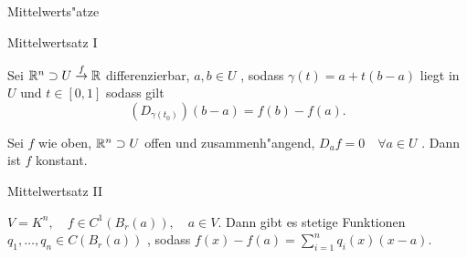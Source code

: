 \documentclass[class=article, crop=false]{standalone}
\begin{document}
\begin{zettel}{Mittelwerts"atze}
\begin{flashcard}[nxg5qj0i]{Mittelwertsatz I}
	\begin{theorem}[Mittelwertsatz I]
		Sei $\mathbb{R}^n \supset  U \stackrel{f}{\to} \mathbb{R} $ differenzierbar, $a, b \in  U$ , sodass $\gamma(t) = a + t (b-a)$ liegt in $U$ und $t \in [0,1]$ sodass gilt
		\[
			\left(D_{\gamma(t_0)}\right) (b - a ) = f(b) - f(a)
		.\]
	\end{theorem}
\end{flashcard}

\begin{corollary}
	Sei $f$ wie oben, $\mathbb{R}^n \supset  U$ offen und zusammenh"angend, $D_a f = 0 \quad \forall a \in  U$ . Dann ist $f$ konstant.
\end{corollary}

\begin{flashcard}[ox7gzhr6]{Mittelwertsatz II}
	\begin{theorem}[Mittelwertsatz II]
		$V = K^n, \quad f \in  C^1 ( B_r(a)), \quad a \in  V$. Dann gibt es stetige Funktionen $ q_1,\dots,q_n \in  C ( B_r(a))$ , sodass $f(x) - f(a) = \sum_{i = 1}^{n} q_i(x) (x - a )$.
	\end{theorem}
\end{flashcard}
\end{zettel}
\end{document}
